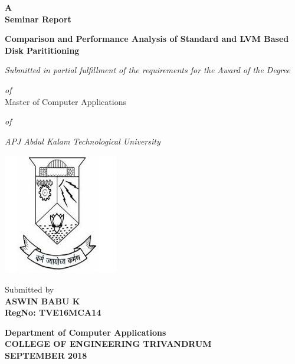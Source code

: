 \begin{titlepage}
\begin{center}
\textbf{ A  }\\
\vspace{0.35cm}
\textbf{ Seminar Report}\\
\vspace{0.55cm}

\textbf{\Large{Comparison and Performance Analysis of Standard and LVM Based Disk Parititioning}}\\
\vspace{0.2cm}

\normalsize
\vspace{0.5cm}
\emph{Submitted in partial fulfillment of the requirements for the Award of the Degree}\\
\vspace{0.35cm}

\emph{of}\\
\vspace{0.35cm}
Master of Computer Applications\\
\vspace{0.35cm}

\emph{of}\\
\vspace{0.35cm}

\emph{ {APJ Abdul Kalam Technological University} }\\
\normalsize
\vspace{0.5cm}

\includegraphics[height=0.30\textwidth]{./logo}\\
\vspace{0.3cm}

Submitted by\\
\vspace{0.3cm}
\textbf{ASWIN BABU K}\\
\vspace{0.5cm}
\textbf{RegNo: TVE16MCA14}\\
\vspace{1.8cm}

\normalsize
\textbf{Department of Computer Applications}\\[0.3cm]
\textbf{COLLEGE OF ENGINEERING TRIVANDRUM}\\[0.4cm]
\textbf{SEPTEMBER 2018}\\
\end{center}
\end{titlepage}

